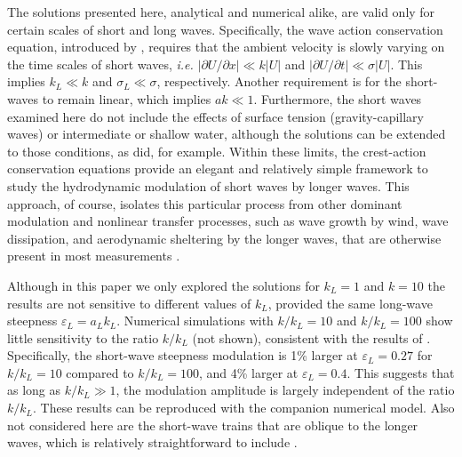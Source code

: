 \documentclass[lineno]{jfm}
\begin{document}
The solutions presented here, analytical and numerical alike, are valid only
for certain scales of short and long waves.
Specifically, the wave action conservation equation, introduced by
\citet{bretherton1968wavetrains}, requires that the ambient velocity is slowly
varying on the time scales of short waves, \textit{i.e.}
$|\partial U / \partial x| \ll k |U|$
and $|\partial U / \partial t| \ll \sigma |U|$.
This implies $k_L \ll k$ and $\sigma_L \ll \sigma$, respectively.
Another requirement is for the short-waves to remain linear, which implies
$a k \ll 1$.
Furthermore, the short waves examined here do not include the effects of
surface tension (gravity-capillary waves) or intermediate or shallow water,
although the solutions can be extended to those conditions, as
\citet{phillips1981dispersion} did, for example.
Within these limits, the crest-action conservation equations provide an
elegant and relatively simple framework to study the hydrodynamic modulation
of short waves by longer waves.
This approach, of course, isolates this particular process from other
dominant modulation and nonlinear transfer processes, such as wave growth
by wind, wave dissipation, and aerodynamic sheltering by the longer waves,
that are otherwise present in most measurements
\citep{plant1986two,laxague2017gravity}. 

Although in this paper we only explored the solutions for $k_L = 1$ and $k=10$
the results are not sensitive to different values of $k_L$, provided the same
long-wave steepness $\varepsilon_L = a_L k_L$.
Numerical simulations with $k/k_L = 10$ and $k/k_L = 100$ show little
sensitivity to the ratio $k/k_L$ (not shown), consistent with the results of
\citet{longuet1987propagation}.
Specifically, the short-wave steepness modulation is 1\% larger at
$\varepsilon_L = 0.27$ for $k/k_L = 10$ compared to $k/k_L = 100$, and 4\%
larger at $\varepsilon_L = 0.4$.
This suggests that as long as $k/k_L \gg 1$, the modulation amplitude is
largely independent of the ratio $k/k_L$.
These results can be reproduced with the companion numerical model.
Also not considered here are the short-wave trains that are oblique to the
longer waves, which is relatively straightforward to include
\citep{peureux2021unsteady}.
\end{document}
